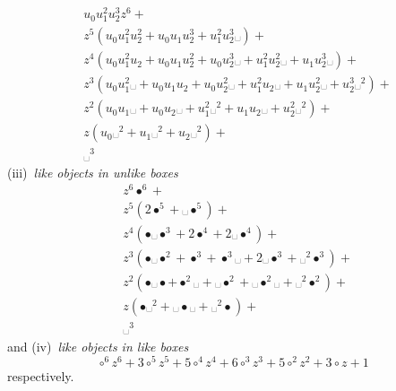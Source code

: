 \begin{example}
\begin{displaymath}
\begin{split}
&u_{0} u_{1}^{2} u_{2}^{3} z^{6} + \\
&z^{5} \left(u_{0} u_{1}^{2} u_{2}^{2} + u_{0} u_{1} u_{2}^{3} + u_{1}^{2} u_{2}^{3} ␣\right) + \\
&z^{4} \left(u_{0} u_{1}^{2} u_{2} + u_{0} u_{1} u_{2}^{2} + u_{0} u_{2}^{3} ␣ + u_{1}^{2} u_{2}^{2} ␣ + u_{1} u_{2}^{3} ␣\right) + \\
&z^{3} \left(u_{0} u_{1}^{2} ␣ + u_{0} u_{1} u_{2} + u_{0} u_{2}^{2} ␣ + u_{1}^{2} u_{2} ␣ + u_{1} u_{2}^{2} ␣ + u_{2}^{3} ␣^{2}\right) + \\
&z^{2} \left(u_{0} u_{1} ␣ + u_{0} u_{2} ␣ + u_{1}^{2} ␣^{2} + u_{1} u_{2} ␣ + u_{2}^{2} ␣^{2}\right) + \\
&z \left(u_{0} ␣^{2} + u_{1} ␣^{2} + u_{2} ␣^{2}\right) + \\
&␣^{3}
\end{split}
\end{displaymath}
(iii)~\textit{like objects in unlike boxes}
\begin{displaymath}
\begin{split}
&z^{6} \bullet^{6} + \\
&z^{5} \left(2 \bullet^{5} + ␣ \bullet^{5}\right) + \\
&z^{4} \left(\bullet ␣ \bullet^{3} + 2 \bullet^{4} + 2 ␣ \bullet^{4}\right) + \\
&z^{3} \left(\bullet ␣ \bullet^{2} + \bullet^{3} + \bullet^{3} ␣ + 2 ␣ \bullet^{3} + ␣^{2} \bullet^{3}\right) + \\
&z^{2} \left(\bullet ␣ \bullet + \bullet^{2} ␣ + ␣ \bullet^{2} + ␣ \bullet^{2} ␣ + ␣^{2} \bullet^{2}\right) + \\
&z \left(\bullet ␣^{2} + ␣ \bullet ␣ + ␣^{2} \bullet\right) + \\
&␣^{3}
\end{split}
\end{displaymath}
and (iv)~\textit{like objects in like boxes}
\begin{displaymath}
\circ^{6} z^{6} + 3 \circ^{5} z^{5} + 5 \circ^{4} z^{4} + 6 \circ^{3} z^{3} + 5 \circ^{2} z^{2} + 3 \circ z + 1
\end{displaymath}
respectively.
\end{example}

